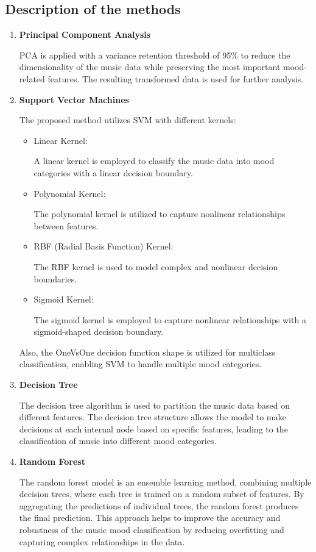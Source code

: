 \documentclass{article}
\begin{document}
\subsection{Description of the methods}
\begin{enumerate}
  \item \textbf{Principal Component Analysis} 

  PCA is applied with a variance retention threshold of 95\% to reduce the dimensionality of the music data while preserving the most important mood-related features. The resulting transformed data is used for further analysis.
  
  \item \textbf{Support Vector Machines}

  The proposed method utilizes SVM with different kernels:
  \begin{itemize}
    \item Linear Kernel: 
    
    A linear kernel is employed to classify the music data into mood categories with a linear decision boundary.
    \item Polynomial Kernel: 
    
    The polynomial kernel is utilized to capture nonlinear relationships between features.
    \item RBF (Radial Basis Function) Kernel: 
    
    The RBF kernel is used to model complex and nonlinear decision boundaries.
    \item Sigmoid Kernel: 
    
    The sigmoid kernel is employed to capture nonlinear relationships with a sigmoid-shaped decision boundary.
\end{itemize}

Also, the OneVsOne decision function shape is utilized for multiclass classification, enabling SVM to handle multiple mood categories.
  
  \item \textbf{Decision Tree}

  The decision tree algorithm is used to partition the music data based on different features. The decision tree structure allows the model to make decisions at each internal node based on specific features, leading to the classification of music into different mood categories.

  \item \textbf{Random Forest}

  The random forest model is an ensemble learning method, combining multiple decision trees, where each tree is trained on a random subset of features. By aggregating the predictions of individual trees, the random forest produces the final prediction. This approach helps to improve the accuracy and robustness of the music mood classification by reducing overfitting and capturing complex relationships in the data.


\end{enumerate}
\end{document}
